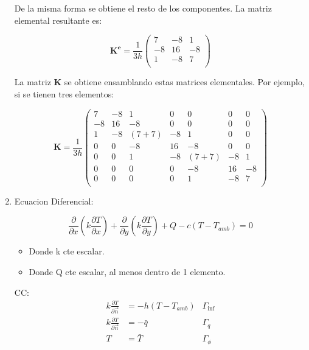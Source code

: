 \documentclass{article}
\begin{document}
\begin{enumerate}[1)]
{        De la misma forma se obtiene el resto de los componentes. La matriz elemental
        resultante es:

        \[ \boldsymbol{K^e} = \frac{1}{3 h} \left( \begin{array}{ccc} 
        7 & -8 & 1 \\
        -8 & 16 & -8 \\
        1 & -8 & 7 \\
        \end{array} \right) \]

        La matriz $\boldsymbol{K}$ se obtiene ensamblando estas matrices elementales.
        Por ejemplo, si se tienen tres elementos:

        \[ \boldsymbol{K} = \frac{1}{3h} \left( \begin{array}{ccccccc}
        7 & -8 & 1 & 0 & 0 & 0 & 0       \\
        -8 & 16 & -8 & 0 & 0 & 0 & 0     \\
        1 & -8 & (7+7) & -8 & 1 & 0 & 0  \\
        0 & 0  & -8 & 16 & -8 & 0 & 0    \\
        0 & 0  & 1 & -8 & (7+7) & -8 & 1 \\
        0 & 0  & 0 & 0  & -8 & 16 & -8   \\
        0 & 0  & 0 & 0  & 1  & -8 & 7    \\
        \end{array} \right) \]
    }
    \setcounter{enumi}{3}
    \item{ %
        Ecuacion Diferencial:

        \begin{equation}
            \frac{\partial }{\partial x}\left(k \frac{\partial T}{\partial x}\right) + \frac{\partial }{\partial y} \left( k \frac{\partial T}{\partial y} \right) + Q - c \left( T - T_{amb} \right) = 0
        \end{equation}

        \begin{itemize}
            \item Donde k cte escalar.
            \item Donde Q cte escalar, al menos dentro de 1 elemento.
        \end{itemize}

        CC:
        \begin{align}
            k \frac{\partial T}{\partial \vec{n}} &= -h\left( T- T_{amb} \right)   &\Gamma_{\inf}\\
            k \frac{\partial T}{\partial \vec{n}} &= -\bar{q}   &\Gamma_{q}\\
            T                                     &=  \bar{T} &\Gamma_{\phi}
        \end{align}

}
\end{enumerate}
\end{document}
